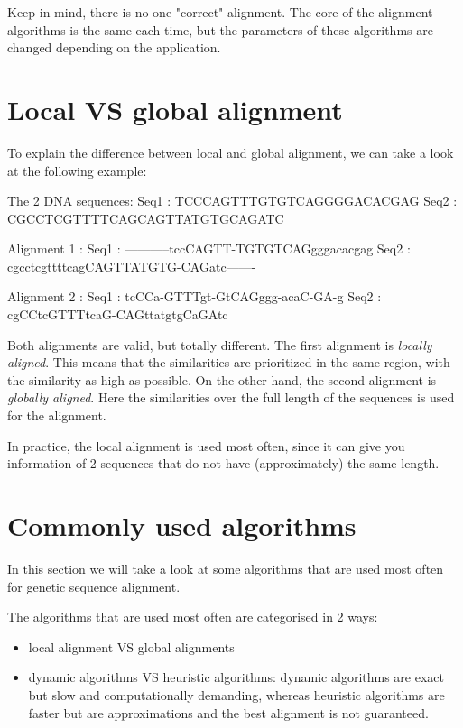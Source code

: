 Keep in mind, there is no one "correct" alignment. The core of the alignment algorithms is the same each time, but the parameters of these algorithms are changed depending on the application.

\section{Local VS global alignment}

To explain the difference between local and global alignment, we can take a look at the following example:

\begin{lcverbatim}
The 2 DNA sequences:
Seq1 : TCCCAGTTTGTGTCAGGGGACACGAG
Seq2 : CGCCTCGTTTTCAGCAGTTATGTGCAGATC

Alignment 1 :
Seq1 : -----------tccCAGTT-TGTGTCAGgggacacgag
Seq2 : cgcctcgttttcagCAGTTATGTG-CAGatc-------

Alignment 2 :
Seq1 : tcCCa-GTTTgt-GtCAGggg-acaC-GA-g
Seq2 : cgCCtcGTTTtcaG-CAGttatgtgCaGAtc
\end{lcverbatim}

Both alignments are valid, but totally different. The first alignment is \emph{locally aligned}. This  means that the similarities are prioritized in the same region, with the similarity as high as possible. On the other hand, the second alignment is \emph{globally aligned}. Here the similarities over the full length of the sequences is used for the alignment. 

In practice, the local alignment is used most often, since it can give you information of 2 sequences that do not have (approximately) the same length.

\section{Commonly used algorithms}

In this section we will take a look at some algorithms that are used most often for genetic sequence alignment.


The algorithms that are used most often are categorised in 2 ways: 

\begin{itemize}
	\item local alignment VS global alignments
	\item dynamic algorithms VS heuristic algorithms: dynamic algorithms are exact but slow and computationally demanding, whereas heuristic algorithms are faster but are approximations and the best alignment is not guaranteed.
\end{itemize}

